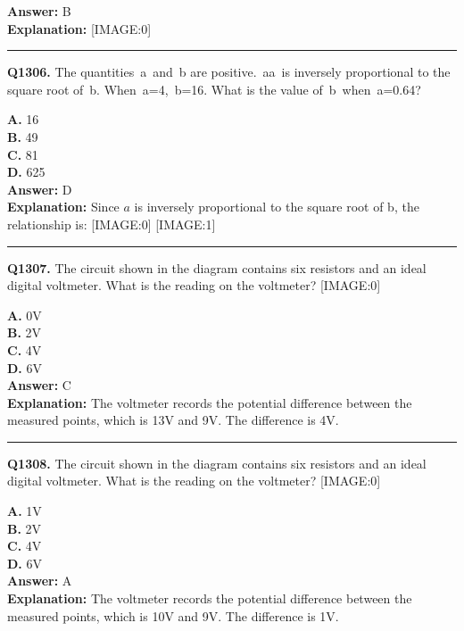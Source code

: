 \documentclass[12pt]{article}
\begin{document}
\textbf{Answer:} B \\
\textbf{Explanation:} [IMAGE:0]

\hrule
\vspace{1em}


\noindent
\textbf{Q1306.} The quantities a and b are positive. aa is inversely proportional to the square root of b. When a=4, b=16. What is the value of b when a=0.64?



\textbf{A.} 16 \\
\textbf{B.} 49 \\
\textbf{C.} 81 \\
\textbf{D.} 625 \\

\textbf{Answer:} D \\
\textbf{Explanation:} Since
$𝑎$
is inversely proportional to the square root of b, the relationship is:
[IMAGE:0]
[IMAGE:1]

\hrule
\vspace{1em}


\noindent
\textbf{Q1307.} The circuit shown in the diagram contains six resistors and an ideal digital voltmeter.
What is the reading on the voltmeter?
[IMAGE:0]



\textbf{A.} 0V \\
\textbf{B.} 2V \\
\textbf{C.} 4V \\
\textbf{D.} 6V \\

\textbf{Answer:} C \\
\textbf{Explanation:} The voltmeter records the potential difference between the measured points, which is 13V and 9V. The difference is 4V.

\hrule
\vspace{1em}


\noindent
\textbf{Q1308.} The circuit shown in the diagram contains six resistors and an ideal digital voltmeter.
What is the reading on the voltmeter?
[IMAGE:0]



\textbf{A.} 1V \\
\textbf{B.} 2V \\
\textbf{C.} 4V \\
\textbf{D.} 6V \\

\textbf{Answer:} A \\
\textbf{Explanation:} The voltmeter records the potential difference between the measured points, which is 10V and 9V. The difference is 1V.
\end{document}
